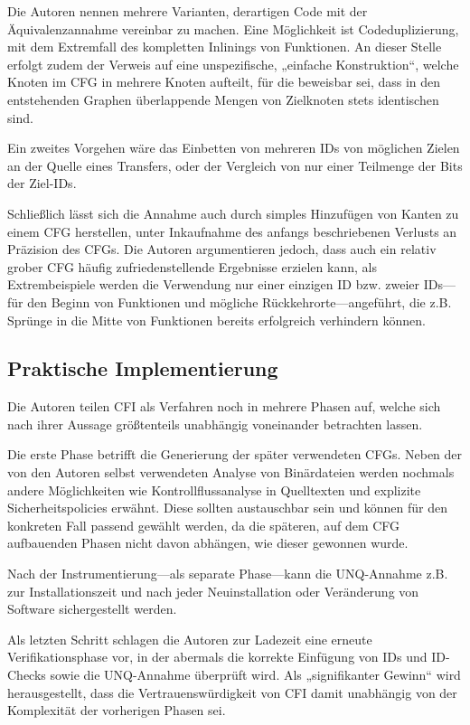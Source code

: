 \documentclass[11pt]{article}
\begin{document}
Die Autoren nennen mehrere Varianten, derartigen Code mit der Äquivalenzannahme
vereinbar zu machen. Eine Möglichkeit ist Codeduplizierung, mit dem Extremfall
des kompletten Inlinings von Funktionen. An dieser Stelle erfolgt zudem der
Verweis auf eine unspezifische, „einfache Konstruktion“, welche Knoten im CFG in
mehrere Knoten aufteilt, für die beweisbar sei, dass in den entstehenden
Graphen überlappende Mengen von Zielknoten stets identischen sind.

Ein zweites Vorgehen wäre das Einbetten von mehreren IDs von möglichen Zielen
an der Quelle eines Transfers, oder der Vergleich von nur einer Teilmenge der
Bits der Ziel-IDs.

\label{coarsecfg}
Schließlich lässt sich die Annahme auch durch simples Hinzufügen von Kanten zu
einem CFG herstellen, unter Inkaufnahme des anfangs beschriebenen Verlusts an
Präzision des CFGs. Die Autoren argumentieren jedoch, dass auch ein relativ
grober CFG häufig zufriedenstellende Ergebnisse erzielen kann, als
Extrembeispiele werden die Verwendung nur einer einzigen ID bzw. zweier IDs—für
den Beginn von Funktionen und mögliche Rückkehrorte—angeführt, die z.B. Sprünge
in die Mitte von Funktionen bereits erfolgreich verhindern können.

\subsection{Praktische Implementierung}

Die Autoren teilen CFI als Verfahren noch in mehrere Phasen auf, welche sich
nach ihrer Aussage größtenteils unabhängig voneinander betrachten lassen.

Die erste Phase betrifft die Generierung der später verwendeten CFGs. Neben der
von den Autoren selbst verwendeten Analyse von Binärdateien werden nochmals
andere Möglichkeiten wie Kontrollflussanalyse in Quelltexten und explizite
Sicherheitspolicies erwähnt. Diese sollten austauschbar sein und können für den
konkreten Fall passend gewählt werden, da die späteren, auf dem CFG aufbauenden
Phasen nicht davon abhängen, wie dieser gewonnen wurde.

Nach der Instrumentierung—als separate Phase—kann die UNQ-Annahme z.B. zur
Installationszeit und nach jeder Neuinstallation oder Veränderung von Software
sichergestellt werden.

Als letzten Schritt schlagen die Autoren zur Ladezeit eine erneute
Verifikationsphase vor, in der abermals die korrekte Einfügung von IDs und
ID-Checks sowie die UNQ-Annahme überprüft wird. Als „signifikanter Gewinn“ wird
herausgestellt, dass die Vertrauenswürdigkeit von CFI damit unabhängig von der
Komplexität der vorherigen Phasen sei.
\end{document}
